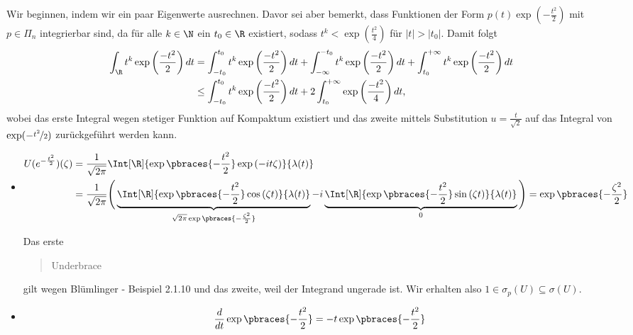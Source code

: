 \begin{solution}

Wir beginnen, indem wir ein paar Eigenwerte ausrechnen.
Davor sei aber bemerkt, dass Funktionen der Form $p(t)\exp(-\frac{t^2}{2})$ mit $p \in \Pi_n$ integrierbar sind, da für alle $k \in \N$
ein $t_0 \in \R$ existiert, sodass $t^k < \exp(\frac{t^2}{4})$ für $|t| > |t_0|$. Damit folgt
\begin{align*}
  \int_\R t^k \exp\left(\frac{-t^2}{2}\right) dt &= \int_{-t_0}^{t_0} t^k \exp\left(\frac{-t^2}{2}\right) dt
  + \int_{-\infty}^{-t_0} t^k \exp\left(\frac{-t^2}{2}\right) dt + \int_{t_0}^{+\infty} t^k \exp\left(\frac{-t^2}{2}\right) dt\\
  &\leq \int_{-t_0}^{t_0} t^k \exp\left(\frac{-t^2}{2}\right) dt + 2\int_{t_0}^{+\infty}\exp\left(\frac{-t^2}{4}\right)  dt,
\end{align*}
wobei das erste Integral wegen stetiger Funktion auf Kompaktum existiert und
das zweite mittels Substitution $u = \frac{t}{\sqrt{2}}$ auf das Integral von $\exp(-\nicefrac{t^2}{2})$
zurückgeführt werden kann.
\FloatBarrier
\begin{itemize}
  \item
  \begin{align*}
    U(e^{-\frac{t^2}{2}})(\zeta)
    & =
    \frac{1}{\sqrt{2 \pi}}
    \Int[\R]
    {
      \exp \pbraces{-\frac{t^2}{2}}
      \exp{(-i t \zeta)}
    }
    {\lambda(t)} \\
    & =
    \frac{1}{\sqrt{2 \pi}}
    \Bigg (
      \underbrace
      {
      \Int[\R]
      {
      \exp \pbraces{-\frac{t^2}{2}}
      \cos{(\zeta t)}
      }
      {\lambda(t)}
      }_{
      \sqrt{2 \pi}
      \exp \pbraces{-\frac{\zeta^2}{2}}
      } -
      i
      \underbrace
      {
      \Int[\R]
      {
      \exp \pbraces{-\frac{t^2}{2}}
      \sin{(\zeta t)}
      }
      {\lambda(t)}
      }_0
    \Bigg )
    =
    \exp \pbraces{-\frac{\zeta^2}{2}}
  \end{align*}

  Das erste \blockquote{Underbrace} gilt wegen Blümlinger - Beispiel 2.1.10 und das zweite, weil der Integrand ungerade ist.
  Wir erhalten also $1 \in \sigma_p(U) \subseteq \sigma(U)$.
  \FloatBarrier
  \FloatBarrier
  \item
  \begin{align*}
    \frac{d}{dt}
    \exp \pbraces{-\frac{t^2}{2}}
    =
    -t \exp \pbraces{-\frac{t^2}{2}}
  \end{align*}




\end{itemize}
\end{solution}
